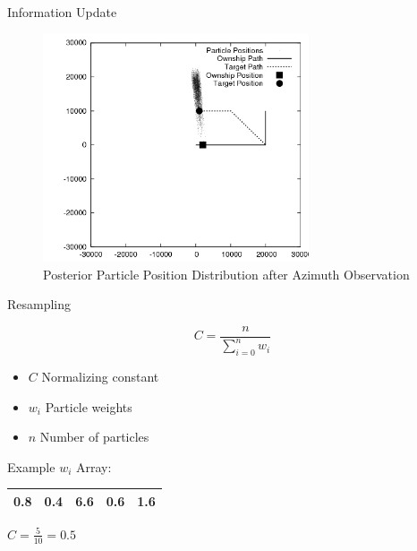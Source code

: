 \documentclass{beamer}
\begin{document}
\begin{frame}{Information Update}

\begin{figure}
\centering
\includegraphics[width=0.7\textwidth]{data/particles_azimuth_obs.png}
\caption{Posterior Particle Position Distribution after Azimuth Observation}
\end{figure}

\end{frame}




\begin{frame}{Resampling}

\begin{equation}\label{resample1}
C = \frac{n}{\sum_{i=0}^{n} w_{i}}
\end{equation}

\vspace{0.5cm}

\begin{itemize}
\item \(C\) Normalizing constant
\item \(w_{i}\) Particle weights
\item \(n\) Number of particles
\end{itemize}

\vspace{0.5cm}

\begin{center}
Example \(w_{i}\) Array:
\end{center}

\renewcommand{\tabcolsep}{0.5cm}
\begin{center}
\begin{tabular}{ | c | c | c | c | c | }
  \hline
   0.8 & 0.4 & 6.6 & 0.6 & 1.6 \\
  \hline
\end{tabular}
\end{center}

\begin{center}
\(C = \frac{5}{10} = 0.5 \)
\end{center}

\end{frame}
\end{document}
